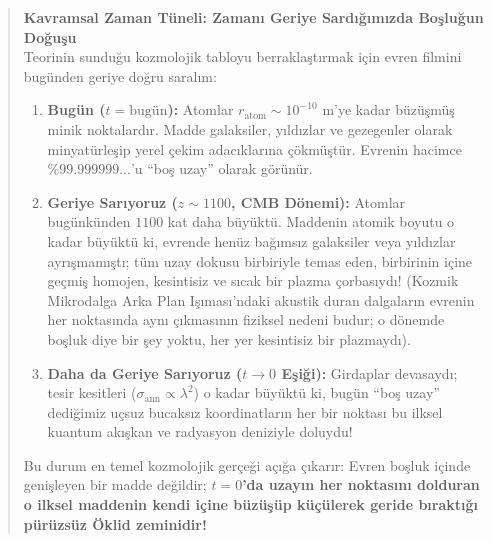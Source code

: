 \documentclass[11pt,a4paper]{article}
\begin{document}
\begin{quote}
    \small
    \textbf{Kavramsal Zaman Tüneli: Zamanı Geriye Sardığımızda Boşluğun Doğuşu} \\
    Teorinin sunduğu kozmolojik tabloyu berraklaştırmak için evren filmini bugünden geriye doğru saralım:
    \begin{enumerate}
        \item \textbf{Bugün ($t = \text{bugün}$):} Atomlar $r_{\mathrm{atom}} \sim 10^{-10}\text{ m}$'ye kadar büzüşmüş minik noktalardır. Madde galaksiler, yıldızlar ve gezegenler olarak minyatürleşip yerel çekim adacıklarına çökmüştür. Evrenin hacimce $\%99.999999...$'u ``boş uzay'' olarak görünür.
        \item \textbf{Geriye Sarıyoruz ($z \sim 1100$, CMB Dönemi):} Atomlar bugünkünden $1100$ kat daha büyüktü. Maddenin atomik boyutu o kadar büyüktü ki, evrende henüz bağımsız galaksiler veya yıldızlar ayrışmamıştı; tüm uzay dokusu birbiriyle temas eden, birbirinin içine geçmiş homojen, kesintisiz ve sıcak bir plazma çorbasıydı! (Kozmik Mikrodalga Arka Plan Işıması'ndaki akustik duran dalgaların evrenin her noktasında aynı çıkmasının fiziksel nedeni budur; o dönemde boşluk diye bir şey yoktu, her yer kesintisiz bir plazmaydı).
        \item \textbf{Daha da Geriye Sarıyoruz ($t \to 0$ Eşiği):} Girdaplar devasaydı; tesir kesitleri ($\sigma_{\mathrm{ann}} \propto \lambda^2$) o kadar büyüktü ki, bugün ``boş uzay'' dediğimiz uçsuz bucaksız koordinatların her bir noktası bu ilksel kuantum akışkan ve radyasyon deniziyle doluydu!
    \end{enumerate}
    Bu durum en temel kozmolojik gerçeği açığa çıkarır: Evren boşluk içinde genişleyen bir madde değildir; \textbf{$t=0$'da uzayın her noktasını dolduran o ilksel maddenin kendi içine büzüşüp küçülerek geride bıraktığı pürüzsüz Öklid zeminidir!}
\end{quote}
\end{document}
